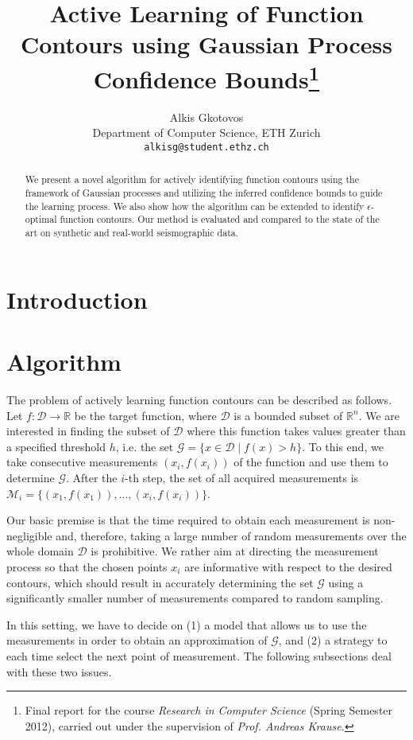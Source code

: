 \documentclass[11pt]{article} %
\title{Active Learning of Function Contours using Gaussian Process Confidence Bounds\thanks{Final
report for the course \emph{Research in Computer Science} (Spring
Semester 2012), carried out under the supervision of \emph{Prof. Andreas Krause.}}}
\author{
Alkis Gkotovos\\
Department of Computer Science, ETH Zurich\\
\texttt{alkisg@student.ethz.ch}
}
\begin{document}
\maketitle

\begin{abstract}
We present a novel algorithm for actively identifying function
contours using the framework of Gaussian processes and utilizing the
inferred confidence bounds to guide the learning process. We also show how
the algorithm can be extended to identify $\epsilon$-optimal function contours.
Our method is evaluated and compared to the state of the art on synthetic and
real-world seismographic data.
\end{abstract}

\section{Introduction}


\section{Algorithm}
The problem of actively learning function contours can be described as follows.
Let ${f : \mathcal{D} \to \mathbb{R}}$ be the target function, where
$\mathcal{D}$ is a bounded subset of $\mathbb{R}^n$. We are interested in
finding the subset of $\mathcal{D}$ where this function takes values greater
than a specified threshold $h$, i.e. the set
$\mathcal{G} = \{x \in \mathcal{D} \mid f(x) > h\}$. To this end, we take
consecutive measurements $(x_i, f(x_i))$ of the function
and use them to determine $\mathcal{G}$. After the $i$-th step, the set of
all acquired measurements is
$\mathcal{M}_i = \{(x_1, f(x_1)),\ldots,(x_i, f(x_i))\}$.

Our basic premise is that the time required to obtain each measurement is
non-negligible and, therefore, taking a large number of random measurements
over the whole domain $\mathcal{D}$ is prohibitive. We rather aim at directing
the measurement process so that the chosen points $x_i$ are informative with
respect to the desired contours, which should result in accurately determining
the set $\mathcal{G}$ using a significantly smaller number of measurements
compared to random sampling.

In this setting, we have to decide on (1) a model that allows us to use the
measurements in order to obtain an approximation of $\mathcal{G}$, and (2) a
strategy to each time select the next point of measurement. The following
subsections deal with these two issues.
\end{document}
